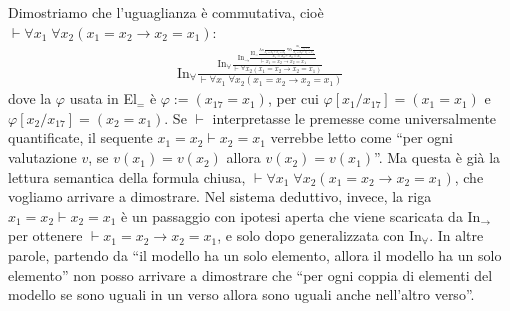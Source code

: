 \begin{example}
    Dimostriamo che l'uguaglianza è commutativa, cioè $\vdash \forall x_1 \; \forall x_2 (x_1 = x_2 \to x_2 = x_1)$:
    \begin{align*}
        \text{In}_\forall\frac{\displaystyle\text{In}_\forall\frac{\displaystyle\text{In}_\to\frac{\displaystyle\text{El}_= \frac{\displaystyle \text{Ax}\frac{}{x_1 = x_2 \vdash x_1 = x_2} \; \text{Wk}\frac{\displaystyle \text{In}_{=}\frac{}{\vdash x_1 = x_1}}{x_1 = x_2 \vdash x_1 = x_1} }{x_1 = x_2 \vdash x_2 = x_1}}{\vdash x_1 = x_2 \to x_2 = x_1}}{\vdash \forall x_2 (x_1 = x_2 \to x_2 = x_1)}}{\vdash \forall x_1 \; \forall x_2 (x_1 = x_2 \to x_2 = x_1)}
    \end{align*}
    dove la $\varphi$ usata in El$_=$ è $\varphi := (x_{17} = x_1)$, per cui $\varphi[x_1/x_{17}] = (x_1 = x_1)$ e $\varphi[x_2/x_{17}] = (x_2 = x_1)$. Se $\vdash$ interpretasse le premesse come universalmente quantificate, il sequente $x_1 = x_2 \vdash x_2 = x_1$ verrebbe letto come ``per ogni valutazione $v$, se $v(x_1)=v(x_2)$ allora $v(x_2)=v(x_1)$''.
    Ma questa è già la lettura semantica della formula chiusa,  $\vdash \forall x_1 \; \forall x_2 (x_1 = x_2 \to x_2 = x_1)$, che vogliamo arrivare a dimostrare. Nel sistema deduttivo, invece, la riga $x_1 = x_2 \vdash x_2 = x_1$ è un passaggio con ipotesi aperta che viene scaricata da In$_\to$ per ottenere $\vdash x_1 = x_2 \to x_2 = x_1$, e solo dopo generalizzata con In$_\forall$.
    In altre parole, partendo da ``il modello ha un solo elemento, allora il modello ha un solo elemento'' non posso arrivare a dimostrare che ``per ogni coppia di elementi del modello se sono uguali in un verso allora sono uguali anche nell'altro verso''.
\end{example}

